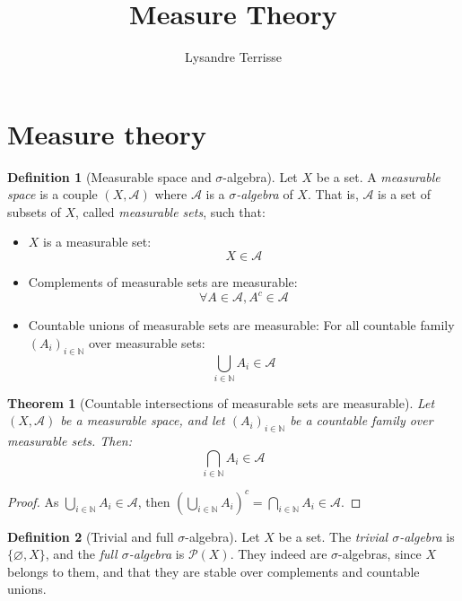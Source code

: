 \documentclass{article}
\title{Measure Theory}
\author{Lysandre Terrisse}
\newtheorem{theorem}{Theorem}[section]
\theoremstyle{definition}
\newtheorem{definition}{Definition}[section]
\theoremstyle{remark}
\theoremstyle{example}
\begin{document}
\maketitle

\section{Measure theory}

\begin{definition}[Measurable space and $\sigma$-algebra]
    Let $X$ be a set. A \textit{measurable space} is a couple $(X, \mathcal{A})$ where $\mathcal{A}$ is a \textit{$\sigma$-algebra} of $X$. That is, $\mathcal{A}$ is a set of subsets of $X$, called \textit{measurable sets}, such that:
    \begin{itemize}
        \item $X$ is a measurable set:
            $$X \in \mathcal{A}$$
        \item Complements of measurable sets are measurable:
            $$\forall A \in \mathcal{A}, A^c \in \mathcal{A}$$
        \item Countable unions of measurable sets are measurable: For all countable family $(A_i)_{i \in \mathbb{N}}$ over measurable sets:
            $$\bigcup_{i \in \mathbb{N}} A_i \in \mathcal{A}$$
    \end{itemize}
\end{definition}

\begin{theorem}[Countable intersections of measurable sets are measurable]
    Let $(X, \mathcal{A})$ be a measurable space, and let $(A_i)_{i \in \mathbb{N}}$ be a countable family over measurable sets. Then:
            $$\bigcap_{i \in \mathbb{N}} A_i \in \mathcal{A}$$
\end{theorem}

\begin{proof}
    As $\bigcup_{i \in \mathbb{N}} A_i \in \mathcal{A}$, then $\left(\bigcup_{i \in \mathbb{N}} A_i\right)^c = \bigcap_{i \in \mathbb{N}} A_i \in \mathcal{A}$.
\end{proof}

\begin{definition}[Trivial and full $\sigma$-algebra]
    Let $X$ be a set. The \textit{trivial $\sigma$-algebra} is $\{\varnothing, X\}$, and the \textit{full $\sigma$-algebra} is $\mathcal{P}(X)$. They indeed are $\sigma$-algebras, since $X$ belongs to them, and that they are stable over complements and countable unions.
\end{definition}
\end{document}
